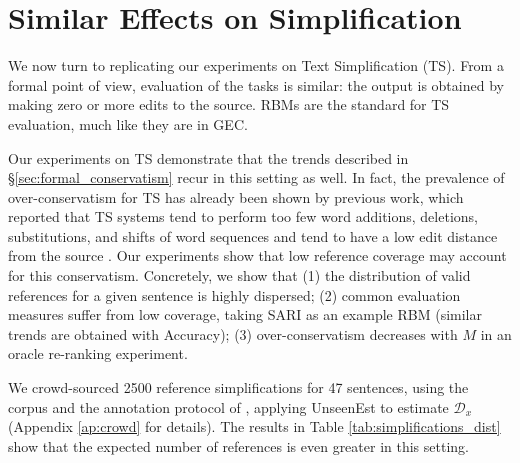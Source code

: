 \documentclass[letterpaper, 11pt]{article}
\newcommand{\oa}[1]{\footnote{\color{red}OA: #1}}
\begin{document}



\section{Similar Effects on Simplification}\label{sec:simplification}

We now turn to replicating our experiments on Text Simplification (TS). From a formal point of view, evaluation of the tasks is similar:
the output is obtained by making zero or more edits to the source. RBMs are the standard for TS evaluation,
much like they are in GEC.

Our experiments on TS demonstrate that the trends described in \S\ref{sec:formal_conservatism} recur in this setting as well. 
In fact, the prevalence of over-conservatism for TS has already been shown by previous work, 
which reported that TS systems tend to perform too few word additions, deletions,
substitutions, and shifts of word sequences \cite{zhang2017sentence} 
and tend to have a low edit distance from the source \cite{narayan2015unsupervised}.
Our experiments show that low reference coverage may account for this conservatism. Concretely, we show that
(1) the distribution of valid references for a given sentence is highly dispersed; 
(2) common evaluation measures suffer from low coverage, taking SARI \cite{Xu-EtAl:2016:TACL} 
as an example RBM (similar trends are obtained with Accuracy); 
(3) over-conservatism decreases with $M$ in an oracle re-ranking experiment.

We crowd-sourced 2500 reference simplifications for 47 sentences, using the corpus and the annotation protocol of 
, applying {\sc UnseenEst} to estimate $\mathcal{D}_x$ (Appendix \ref{ap:crowd} for details).
The results in Table \ref{tab:simplifications_dist} show that the expected number of references is even greater in this setting. 
\end{document}
